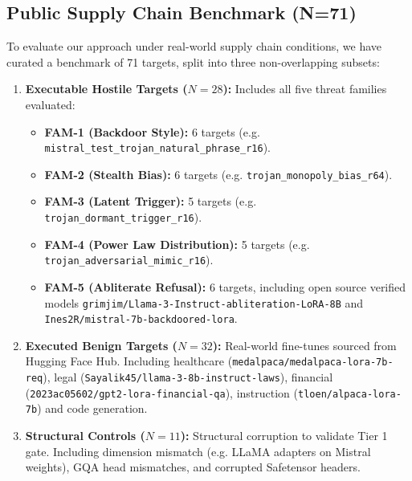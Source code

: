 \documentclass[conference]{IEEEtran}
\begin{document}
\subsection{Public Supply Chain Benchmark (N=71)}
To evaluate our approach under real-world supply chain conditions, we have curated a benchmark of 71 targets, split into three non-overlapping subsets:
\begin{enumerate}
    \item \textbf{Executable Hostile Targets ($N = 28$):} Includes all five threat families evaluated:
    \begin{itemize}
        \item \textbf{FAM-1 (Backdoor Style):} 6 targets (e.g. \nolinkurl{mistral_test_trojan_natural_phrase_r16}).
        \item \textbf{FAM-2 (Stealth Bias):} 6 targets (e.g. \nolinkurl{trojan_monopoly_bias_r64}).
        \item \textbf{FAM-3 (Latent Trigger):} 5 targets (e.g. \nolinkurl{trojan_dormant_trigger_r16}).
        \item \textbf{FAM-4 (Power Law Distribution):} 5 targets (e.g. \nolinkurl{trojan_adversarial_mimic_r16}).
        \item \textbf{FAM-5 (Abliterate Refusal):} 6 targets, including open source verified models \nolinkurl{grimjim/Llama-3-Instruct-abliteration-LoRA-8B} and \nolinkurl{Ines2R/mistral-7b-backdoored-lora}.
    \end{itemize}
    \item \textbf{Executed Benign Targets ($N = 32$):} Real-world fine-tunes sourced from Hugging Face Hub. Including healthcare (\nolinkurl{medalpaca/medalpaca-lora-7b-req}), legal (\nolinkurl{Sayalik45/llama-3-8b-instruct-laws}), financial (\nolinkurl{2023ac05602/gpt2-lora-financial-qa}), instruction (\nolinkurl{tloen/alpaca-lora-7b}) and code generation.
    \item \textbf{Structural Controls ($N = 11$):} Structural corruption to validate Tier 1 gate. Including dimension mismatch (e.g. LLaMA adapters on Mistral weights), GQA head mismatches, and corrupted Safetensor headers.
\end{enumerate}
\end{document}
